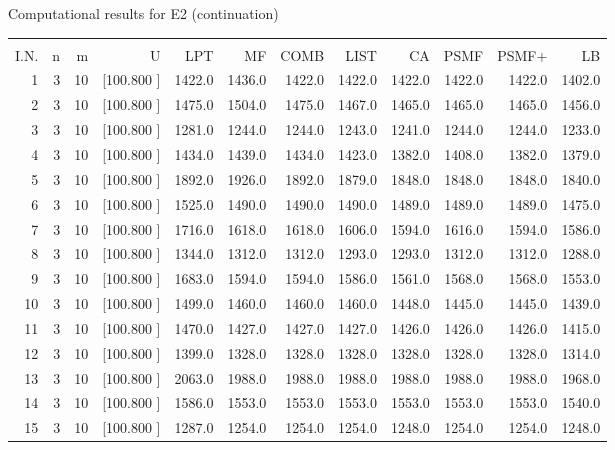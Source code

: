 \documentclass[12pt,a4paper]{article}
\begin{document}
\begin{center}
 Computational results for E2 (continuation) {\tiny
\begin{tabular}{r r r r r r r r r r r r}\hline
    &   &   &          &        &        &        &        &        &        &        &       \\[-0.1in]
  I.N.  &  n  &  m  &  U  &  LPT  &  MF  &  COMB  &  LIST  &  CA  & PSMF &PSMF+ & LB \\[0.03in]
\hline
   1&  3& 10&[100.800   ]&  1422.0&  1436.0&  1422.0&  1422.0&  1422.0&  1422.0&  1422.0&  1402.0\\[-0.02in]
   2&  3& 10&[100.800   ]&  1475.0&  1504.0&  1475.0&  1467.0&  1465.0&  1465.0&  1465.0&  1456.0\\[-0.02in]
   3&  3& 10&[100.800   ]&  1281.0&  1244.0&  1244.0&  1243.0&  1241.0&  1244.0&  1244.0&  1233.0\\[-0.02in]
   4&  3& 10&[100.800   ]&  1434.0&  1439.0&  1434.0&  1423.0&  1382.0&  1408.0&  1382.0&  1379.0\\[-0.02in]
   5&  3& 10&[100.800   ]&  1892.0&  1926.0&  1892.0&  1879.0&  1848.0&  1848.0&  1848.0&  1840.0\\[-0.02in]
   6&  3& 10&[100.800   ]&  1525.0&  1490.0&  1490.0&  1490.0&  1489.0&  1489.0&  1489.0&  1475.0\\[-0.02in]
   7&  3& 10&[100.800   ]&  1716.0&  1618.0&  1618.0&  1606.0&  1594.0&  1616.0&  1594.0&  1586.0\\[-0.02in]
   8&  3& 10&[100.800   ]&  1344.0&  1312.0&  1312.0&  1293.0&  1293.0&  1312.0&  1312.0&  1288.0\\[-0.02in]
   9&  3& 10&[100.800   ]&  1683.0&  1594.0&  1594.0&  1586.0&  1561.0&  1568.0&  1568.0&  1553.0\\[-0.02in]
  10&  3& 10&[100.800   ]&  1499.0&  1460.0&  1460.0&  1460.0&  1448.0&  1445.0&  1445.0&  1439.0\\[-0.02in]
  11&  3& 10&[100.800   ]&  1470.0&  1427.0&  1427.0&  1427.0&  1426.0&  1426.0&  1426.0&  1415.0\\[-0.02in]
  12&  3& 10&[100.800   ]&  1399.0&  1328.0&  1328.0&  1328.0&  1328.0&  1328.0&  1328.0&  1314.0\\[-0.02in]
  13&  3& 10&[100.800   ]&  2063.0&  1988.0&  1988.0&  1988.0&  1988.0&  1988.0&  1988.0&  1968.0\\[-0.02in]
  14&  3& 10&[100.800   ]&  1586.0&  1553.0&  1553.0&  1553.0&  1553.0&  1553.0&  1553.0&  1540.0\\[-0.02in]
  15&  3& 10&[100.800   ]&  1287.0&  1254.0&  1254.0&  1254.0&  1248.0&  1254.0&  1254.0&  1248.0\\[-0.02in]

\end{tabular}}
\end{center}
\end{document}

